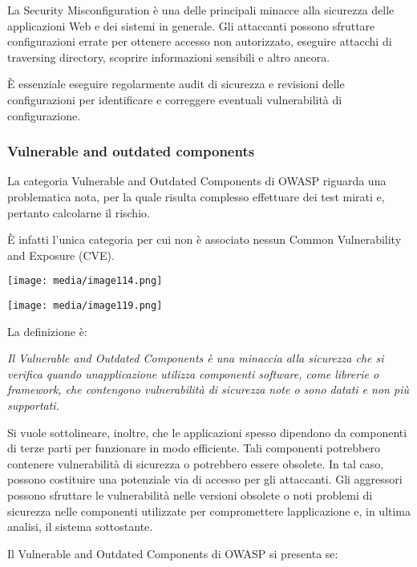 La Security Misconfiguration è una delle principali minacce alla
sicurezza delle applicazioni Web e dei sistemi in generale. Gli
attaccanti possono sfruttare configurazioni errate per ottenere accesso
non autorizzato, eseguire attacchi di traversing directory, scoprire
informazioni sensibili e altro ancora.

È essenziale eseguire regolarmente audit di sicurezza e revisioni delle
configurazioni per identificare e correggere eventuali vulnerabilità di
configurazione.

\subsubsection{Vulnerable and outdated
components}\label{vulnerable-and-outdated-components}

La categoria Vulnerable and Outdated Components di OWASP riguarda una
problematica nota, per la quale risulta complesso effettuare dei test
mirati e, pertanto calcolarne il rischio.

È infatti l'unica categoria per cui non è associato nessun Common
Vulnerability and Exposure (CVE).

\texttt{[image: media/image114.png]}

\texttt{[image: media/image119.png]}

La definizione è:

\emph{Il Vulnerable and Outdated Components è una minaccia alla
sicurezza che si verifica quando un\textquotesingle applicazione
utilizza componenti software, come librerie o framework, che contengono
vulnerabilità di sicurezza note o sono datati e non più supportati.}

Si vuole sottolineare, inoltre, che le applicazioni spesso dipendono da
componenti di terze parti per funzionare in modo efficiente. Tali
componenti potrebbero contenere vulnerabilità di sicurezza o potrebbero
essere obsolete. In tal caso, possono costituire una potenziale via di
accesso per gli attaccanti. Gli aggressori possono sfruttare le
vulnerabilità nelle versioni obsolete o noti problemi di sicurezza nelle
componenti utilizzate per compromettere l\textquotesingle applicazione
e, in ultima analisi, il sistema sottostante.

Il Vulnerable and Outdated Components di OWASP si presenta se:

